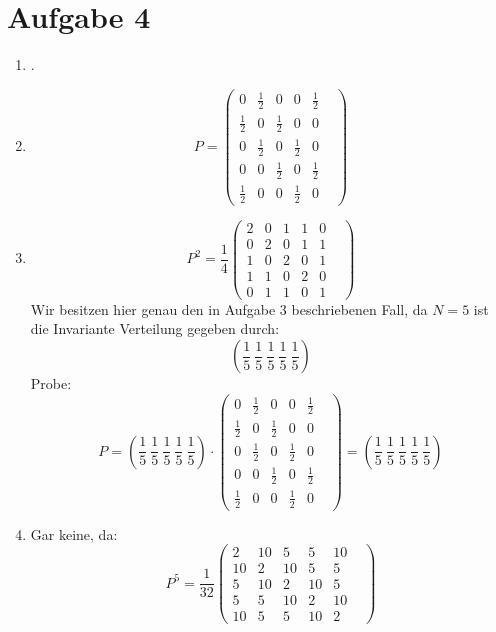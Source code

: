 \documentclass[10pt,a4paper,parskip=half]{scrartcl}
\begin{document}
\section*{Aufgabe 4}
\begin{enumerate}
\item .
\vspace{5cm}
\item
$$P = \left(\begin{matrix}
0 & \frac12 & 0 & 0 & \frac12 & \\
\frac12 & 0 & \frac12 & 0 & 0 & \\
0 & \frac12 & 0 & \frac12 & 0 & \\
0 & 0 & \frac12 & 0 & \frac12 & \\
\frac12 & 0 & 0 & \frac12 & 0
\end{matrix}\right)$$
\item
$$P^2 = \frac14\left(\begin{matrix}
2 & 0 & 1 & 1 & 0 & \\
0 & 2 & 0 & 1 & 1 & \\
1 & 0 & 2 & 0 & 1 & \\
1 & 1 & 0 & 2 & 0 & \\
0 & 1 & 1 & 0 & 1
\end{matrix}\right)$$
Wir besitzen hier genau den in Aufgabe 3 beschriebenen Fall, da $N=5$ ist die Invariante Verteilung gegeben durch:
$$\left(\frac15~\frac15~\frac15~\frac15~\frac15\right)$$
Probe:
$$P = \left(\frac15~\frac15~\frac15~\frac15~\frac15\right)\cdot\left(\begin{matrix}
0 & \frac12 & 0 & 0 & \frac12 & \\
\frac12 & 0 & \frac12 & 0 & 0 & \\
0 & \frac12 & 0 & \frac12 & 0 & \\
0 & 0 & \frac12 & 0 & \frac12 & \\
\frac12 & 0 & 0 & \frac12 & 0
\end{matrix}\right) = \left(\frac15~\frac15~\frac15~\frac15~\frac15\right)$$
\item Gar keine, da:
$$P^5 = \frac1{32}\left(\begin{matrix}
2 & 10 & 5 & 5 & 10 & \\
10 & 2 & 10 & 5 & 5 & \\
5 & 10 & 2 & 10 & 5 & \\
5 & 5 & 10 & 2 & 10 & \\
10 & 5 & 5 & 10 & 2
\end{matrix}\right)$$
\end{enumerate}
\end{document}
